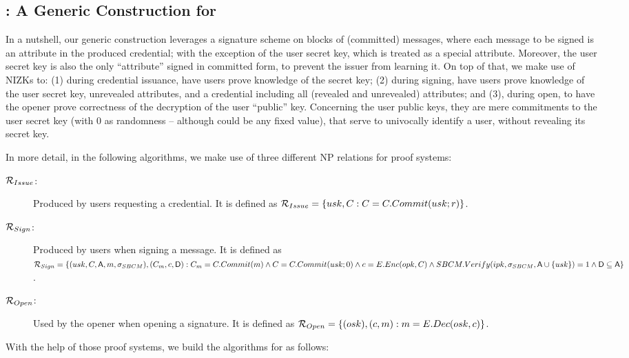 \subsection{\GSACGen: A Generic Construction for \GSAC}
\label{ssec:generic-gsac}

In a nutshell, our generic \GSAC construction leverages a signature scheme
on blocks of (committed) messages, where each message to be signed is an
attribute in the produced credential; with the exception of the user secret key,
which is treated as a special attribute. Moreover, the user secret key is also
the only ``attribute'' signed in committed form, to prevent the issuer from
learning it. On top of that, we make use of NIZKs to: (1) during credential
issuance, have users prove knowledge of the secret key; (2) during signing,
have users prove knowledge of the user secret key, unrevealed attributes, and
a credential including all (revealed and unrevealed) attributes; and (3), during
open, to have the opener prove correctness of the decryption of the user
``public'' key. Concerning the user public keys, they are mere commitments to
the user secret key (with $0$ as randomness -- although could be any fixed
value), that serve to univocally identify a user, without revealing its secret
key.

In more detail, in the following algorithms, we make use of three different NP
relations for \NIZK proof systems:

\begin{description}
\item[$\mathcal{R}_{Issue}$:] Produced by users requesting a credential. It is
  defined as $\mathcal{R}_{Issue} = \lbrace usk, C :
  C = C.Commit(usk; r) \rbrace$.
\item[$\mathcal{R}_{Sign}$:] Produced by users when signing a message. It is
  defined as $\mathcal{R}_{Sign} = \lbrace (usk,C,\mathsf{A},m,\sigma_{SBCM}),
  (C_{m},c,\mathsf{D}) : C_{m} = C.Commit(m) \land C =
  C.Commit(usk; 0) \land c = E.Enc(opk,C)
  \land SBCM.Verify(ipk,\sigma_{SBCM},\mathsf{A} \cup \lbrace usk \rbrace) = 1
  \land \mathsf{D} \subseteq \mathsf{A} \rbrace$.
\item[$\mathcal{R}_{Open}$:] Used by the opener when opening a signature. It
  is defined as $\mathcal{R}_{Open} = \lbrace (osk), (c,m) :
  m = E.Dec(osk,c) \rbrace$.
\end{description}

With the help of those \NIZK proof systems, we build the algorithms for
\GSACGen as follows:


